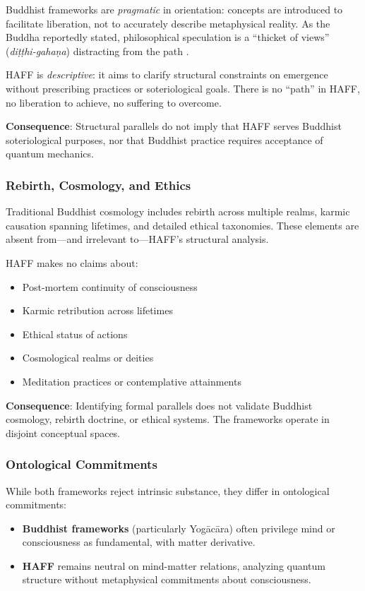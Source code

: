 \documentclass[12pt,a4paper,openany]{book}
\begin{document}
Buddhist frameworks are \emph{pragmatic} in orientation: concepts are introduced to facilitate liberation, not to accurately describe metaphysical reality. As the Buddha reportedly stated, philosophical speculation is a ``thicket of views'' (\emph{di\d{t}\d{t}hi-gahaṇa}) distracting from the path \cite{SuttaNipata}.

HAFF is \emph{descriptive}: it aims to clarify structural constraints on emergence without prescribing practices or soteriological goals. There is no ``path'' in HAFF, no liberation to achieve, no suffering to overcome.

\textbf{Consequence}: Structural parallels do not imply that HAFF serves Buddhist soteriological purposes, nor that Buddhist practice requires acceptance of quantum mechanics.

\subsubsection{Rebirth, Cosmology, and Ethics}

Traditional Buddhist cosmology includes rebirth across multiple realms, karmic causation spanning lifetimes, and detailed ethical taxonomies. These elements are absent from—and irrelevant to—HAFF's structural analysis.

HAFF makes no claims about:
\begin{itemize}
\item Post-mortem continuity of consciousness
\item Karmic retribution across lifetimes
\item Ethical status of actions
\item Cosmological realms or deities
\item Meditation practices or contemplative attainments
\end{itemize}

\textbf{Consequence}: Identifying formal parallels does not validate Buddhist cosmology, rebirth doctrine, or ethical systems. The frameworks operate in disjoint conceptual spaces.

\subsubsection{Ontological Commitments}

While both frameworks reject intrinsic substance, they differ in ontological commitments:
\begin{itemize}
\item \textbf{Buddhist frameworks} (particularly Yog\=ac\=ara) often privilege mind or consciousness as fundamental, with matter derivative.
\item \textbf{HAFF} remains neutral on mind-matter relations, analyzing quantum structure without metaphysical commitments about consciousness.
\end{itemize}
\end{document}
